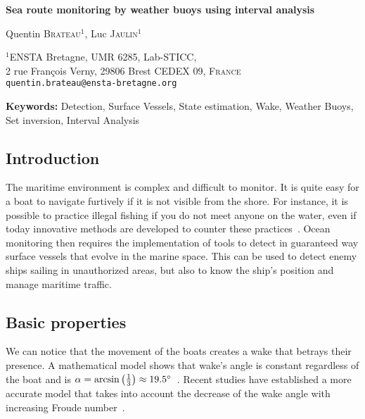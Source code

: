 \documentclass[14pt, a4paper]{article}
\begin{document}
	\begin{center}

		{\Large\bf Sea route monitoring by weather buoys using interval analysis}

		\vspace*{0.8cm}

		{\large Quentin \textsc{Brateau}$^{1}$, Luc \textsc{Jaulin}$^{1}$}

		\bigskip

		{\small $^{1}$ENSTA Bretagne, UMR 6285, Lab-STICC, \\
		2 rue François Verny, 29806 Brest CEDEX 09, \textsc{France} \\
		\texttt{quentin.brateau@ensta-bretagne.org}
		}

	\end{center}

	\bigskip

	{\noindent\bf Keywords:} Detection, Surface Vessels, State estimation, Wake, Weather Buoys, Set inversion, Interval Analysis

	\subsection*{Introduction}
		The maritime environment is complex and difficult to monitor. It is quite easy for a boat to navigate furtively if it is not visible from the shore. For instance, it is possible to practice illegal fishing if you do not meet anyone on the water, even if today innovative methods are developed to counter these practices~\cite{doi:10.1073/pnas.1915499117}. Ocean monitoring then requires the implementation of tools to detect in guaranteed way surface vessels that evolve in the marine space. This can be used to detect enemy ships sailing in unauthorized areas, but also to know the ship's position and manage maritime traffic.

	\subsection*{Basic properties}
		We can notice that the movement of the boats creates a wake that betrays their presence. A mathematical model shows that wake's angle is constant regardless of the boat and is $\alpha = \arcsin\left(\frac{1}{3}\right) \approx 19.5 \degree$~\cite{thomson1887ship, stoker1992water}. Recent studies have established a more accurate model that takes into account the decrease of the wake angle with increasing Froude number~\cite{Rabaud_2013}.
		
\end{document}
